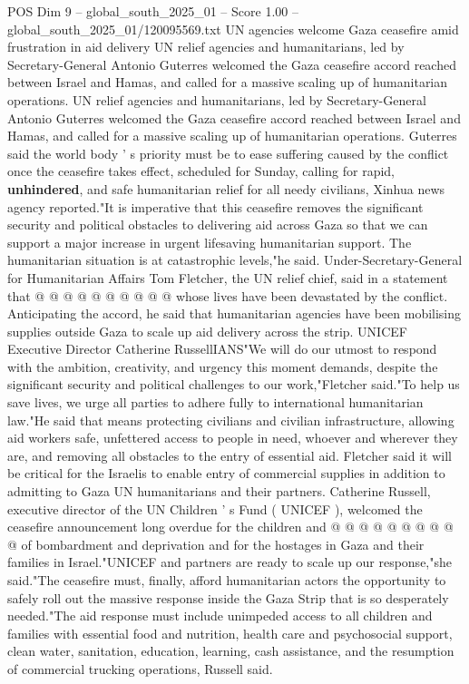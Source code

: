 \begin{textsample}{POS Dim 9 – global\_south\_2025\_01 – Score 1.00 – global\_south\_2025\_01/120095569.txt}  \label{ex:f9_pos_349}
UN agencies welcome Gaza ceasefire amid frustration in aid delivery UN relief agencies and humanitarians, led by Secretary-General Antonio Guterres welcomed the Gaza ceasefire accord reached between Israel and Hamas, and called for a massive scaling up of humanitarian operations.
UN relief agencies and humanitarians, led by Secretary-General Antonio Guterres welcomed the Gaza ceasefire accord reached between Israel and Hamas, and called for a massive scaling up of humanitarian operations.
Guterres said the world body ' s priority must be to ease suffering caused by the conflict once the ceasefire takes effect, scheduled for Sunday, calling for rapid, \textbf{unhindered}, and safe humanitarian relief for all needy civilians, Xinhua news agency reported."It is imperative that this ceasefire removes the significant security and political obstacles to delivering aid across Gaza so that we can support a major increase in urgent lifesaving humanitarian support.
The humanitarian situation is at catastrophic levels,"he said.
Under-Secretary-General for Humanitarian Affairs Tom Fletcher, the UN relief chief, said in a statement that @ @ @ @ @ @ @ @ @ @ whose lives have been devastated by the conflict.
Anticipating the accord, he said that humanitarian agencies have been mobilising supplies outside Gaza to scale up aid delivery across the strip.
UNICEF Executive Director Catherine RussellIANS"We will do our utmost to respond with the ambition, creativity, and urgency this moment demands, despite the significant security and political challenges to our work,"Fletcher said."To help us save lives, we urge all parties to adhere fully to international humanitarian law."He said that means protecting civilians and civilian infrastructure, allowing aid workers safe, unfettered access to people in need, whoever and wherever they are, and removing all obstacles to the entry of essential aid.
Fletcher said it will be critical for the Israelis to enable entry of commercial supplies in addition to admitting to Gaza UN humanitarians and their partners.
Catherine Russell, executive director of the UN Children ' s Fund ( UNICEF ), welcomed the ceasefire announcement long overdue for the children and @ @ @ @ @ @ @ @ @ @ of bombardment and deprivation and for the hostages in Gaza and their families in Israel."UNICEF and partners are ready to scale up our response,"she said."The ceasefire must, finally, afford humanitarian actors the opportunity to safely roll out the massive response inside the Gaza Strip that is so desperately needed."The aid response must include unimpeded access to all children and families with essential food and nutrition, health care and psychosocial support, clean water, sanitation, education, learning, cash assistance, and the resumption of commercial trucking operations, Russell said.

\end{textsample}
